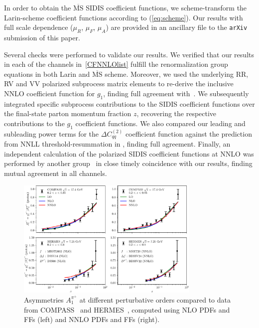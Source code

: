\documentclass[10pt,aps,prl,twocolumn,preprintnumbers,nofootinbib]{revtex4-2}
\newcommand\MSbar{\overline{\mathrm{MS}}}
\begin{document}
In order to obtain the $\MSbar$ SIDIS coefficient functions, we scheme-transform the Larin-scheme coefficient functions
according to (\ref{eq:scheme}).  
Our results with full scale dependence ($\mu_R$, $\mu_F$, $\mu_A$) are provided in an ancillary file to the \texttt{arXiv} submission of this paper.

Several checks were performed to validate our results. 
We verified that our results in each of the channels in~\eqref{CFNNLOlist}
fulfill the renormalization group equations in both Larin and $\MSbar$ scheme.
Moreover, we used the underlying RR, RV and VV 
polarized subprocess 
matrix elements to re-derive the inclusive NNLO coefficient 
function for $g_1$, finding 
full agreement with~\cite{Zijlstra:1993sh}. We subsequently 
integrated specific subprocess contributions to the 
SIDIS coefficient functions over the 
final-state parton momentum fraction $z$, recovering 
the respective  contributions to the $g_1$ coefficient 
functions. 
We also compared our leading and subleading power terms for the $\Delta C_{qq}^{(2)}$ coefficient function against the prediction from NNLL threshold-resummation in \cite{Abele:2021nyo},  finding full agreement.
Finally, an independent calculation of the polarized SIDIS coefficient functions at NNLO was performed by another group~\cite{Goyal:2024tmo}
 in close timely coincidence with our results, finding mutual agreement in all channels.   
\begin{figure}[t]
  \includegraphics[width=0.78\textwidth]{figure1.pdf}
  \caption{Asymmetries $A_1^{\pi^+}$ at different perturbative orders compared to data 
  from COMPASS~\protect\cite{COMPASS:2010hwr}  
  and HERMES~\protect\cite{HERMES:2018awh}, 
  computed using 
  NLO PDFs and FFs (left) and NNLO PDFs and FFs (right).}
  \label{fig:compassandhermesdata}
\end{figure}

\end{document}
